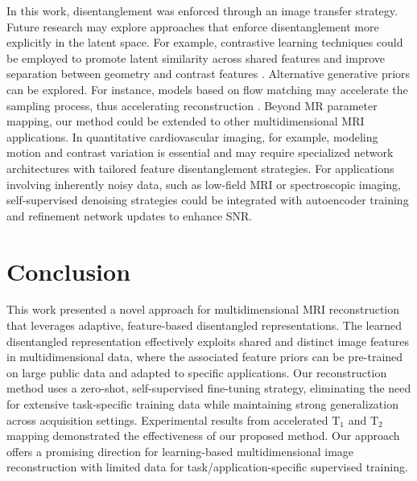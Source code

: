 \documentclass[journal,twoside,web]{ieeecolor}
\begin{document}
In this work, disentanglement was enforced through an image transfer strategy. Future research may explore approaches that enforce disentanglement more explicitly in the latent space. For example, contrastive learning techniques could be employed to promote latent similarity across shared features and improve separation between geometry and contrast features \cite{radford2021learning,ouyang2021representation}. 
Alternative generative priors can be explored. For instance, models based on flow matching may accelerate the sampling process, thus accelerating reconstruction \cite{lipman2022flow}. Beyond MR parameter mapping, our method could be extended to other multidimensional MRI applications. In quantitative cardiovascular imaging, for example, modeling motion and contrast variation is essential \cite{christodoulou2018magnetic} and may require specialized network architectures with tailored feature disentanglement strategies. For applications involving inherently noisy data, such as low-field MRI or spectroscopic imaging, self-supervised denoising strategies could be integrated with autoencoder training and refinement network updates to enhance SNR.

\section{Conclusion}
This work presented a novel approach for multidimensional MRI reconstruction that leverages adaptive, feature-based disentangled representations. The learned disentangled representation effectively exploits shared and distinct image features in multidimensional data, where the associated feature priors can be pre-trained on large public data and adapted to specific applications. Our reconstruction method uses a zero-shot, self-supervised fine-tuning strategy, eliminating the need for extensive task-specific training data while maintaining strong generalization across acquisition settings. Experimental results from accelerated $\text{T}_1$ and $\text{T}_2$ mapping demonstrated the effectiveness of our proposed method. Our approach offers a promising direction for learning-based multidimensional image reconstruction with limited data for task/application-specific supervised training.


\end{document}
